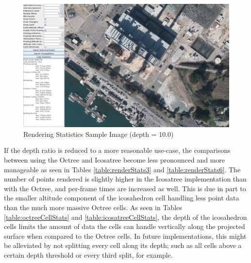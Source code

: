 \begin{figure}[htp]
\begin{center}
  \includegraphics[width=6.0in]{images/rendering10.png}
  \caption{Rendering Statistics Sample Image (depth = 10.0)}
  \label{fig:rendering10}
\end{center}
\end{figure}

If the depth ratio is reduced to a more reasonable use-case, the comparisons
between using the Octree and Icosatree become less pronounced and more
manageable as seen in Tables \ref{table:renderStats3} and
\ref{table:renderStats6}.
The number of points rendered is slightly higher in the Icosatree implementation
than with the Octree, and per-frame times are increased as well. This is due in
part to the smaller altitude component of the icosahedron cell handling less
point data than the much more massive Octree cells. As seen in Tables
\ref{table:octreeCellStats} and \ref{table:icosatreeCellStats}, the depth of the
icosahedron cells limits the amount of data the cells can handle vertically
along the projected surface when compared to the Octree cells. In future
implementations, this might be alleviated by not splitting every cell along its
depth; such as all cells above a certain depth threshold or every third split,
for example.

\begin{table}[htp]
\caption{Rendering Statistics (depth = 3.0)}
\label{table:renderStats3}
\end{table}


